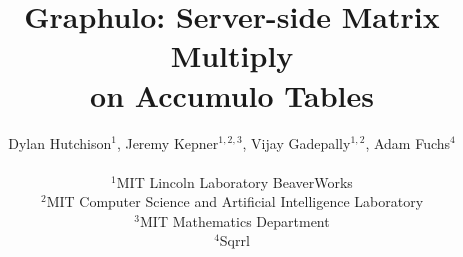 \documentclass[conference]{IEEEtran}
\begin{document}
\title{Graphulo: Server-side Matrix Multiply\\on Accumulo Tables}



\author[D. Hutchison et al.]
       {Dylan Hutchison$^1$, Jeremy Kepner$^{1,2,3}$, Vijay Gadepally$^{1,2}$, Adam Fuchs$^4$\\
         \\
         $^1$MIT Lincoln Laboratory BeaverWorks\\
         $^2$MIT Computer Science and Artificial Intelligence Laboratory\\
         $^3$MIT Mathematics Department\\
         $^4$Sqrrl\\
       }


%
\end{document}
